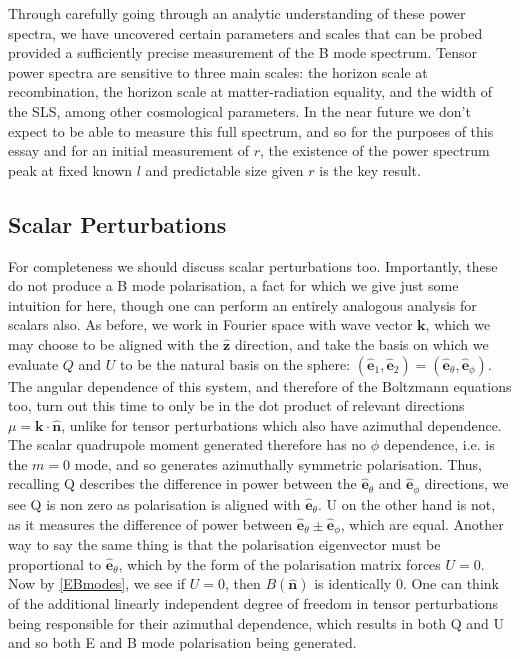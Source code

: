 \documentclass[a4paper,10pt]{article}
\renewcommand{\v}[1]{\mathbf{#1}}
\newcommand{\unit}[1]{\hat{\v{#1}}}
\begin{document}
Through carefully going through an analytic understanding of these power spectra, we have uncovered certain parameters and scales that can be probed provided a sufficiently precise measurement of the B mode spectrum. Tensor power spectra are sensitive to three main scales: the horizon scale at recombination, the horizon scale at matter-radiation equality, and the width of the SLS, among other cosmological parameters. In the near future we don't expect to be able to measure this full spectrum, and so for the purposes of this essay and for an initial measurement of $r$, the existence of the power spectrum peak at fixed known $l$ and predictable size given $r$ is the key result.



\subsection{Scalar Perturbations}

For completeness we should discuss scalar perturbations too. Importantly, these do not produce a B mode polarisation, a fact for which we give just some intuition for here, though one can perform an entirely analogous analysis for scalars also. As before, we work in Fourier space with wave vector $\v{k}$, which we may choose to be aligned with the $\unit{z}$ direction, and take the basis on which we evaluate $Q$ and $U$ to be the natural basis on the sphere: $(\unit{e}_1, \unit{e}_2) = (\unit{e}_\theta, \unit{e}_\phi)$. The angular dependence of this system, and therefore of the Boltzmann equations too, turn out this time to only be in the dot product of relevant directions $\mu=\v{k}\cdot\unit{n}$, unlike for tensor perturbations which also have azimuthal dependence. The scalar quadrupole moment generated therefore has no $\phi$ dependence, i.e. is the $m=0$ mode, and so generates azimuthally symmetric polarisation. Thus, recalling Q describes the difference in power between the $\unit{e}_\theta$ and $\unit{e}_\phi$ directions, we see Q is non zero as polarisation is aligned with $\unit{e}_\theta$. U on the other hand is not, as it measures the difference of power between $\unit{e}_\theta\pm\unit{e}_\phi$, which are equal. Another way to say the same thing is that the polarisation eigenvector must be proportional to $\unit{e}_\theta$, which by the form of the polarisation matrix forces $U=0$. Now by \ref{EBmodes}, we see if $U=0$, then $B(\unit{n})$ is identically 0. One can think of the additional linearly independent degree of freedom in tensor perturbations being responsible for their azimuthal dependence, which results in both Q and U and so both E and B mode polarisation being generated. 
\end{document}
